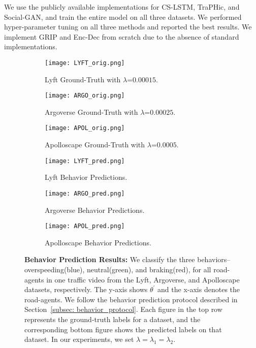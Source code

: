 \documentclass[10pt,twocolumn,letterpaper]{article}
\theoremstyle{plain}
\begin{document}
We use the publicly available implementations for CS-LSTM, TraPHic, and Social-GAN, and train the entire model on all three datasets. We performed hyper-parameter tuning on all three methods and reported the best results. We implement GRIP and Enc-Dec from scratch due to the absence of standard implementations.
\begin{figure*}
  \begin{subfigure}[h]{0.34\textwidth}
    \texttt{[image: LYFT\_orig.png]}
    \caption{Lyft Ground-Truth with $\lambda$=$0.00015$.}
    \label{fig:1}
  \end{subfigure}
\begin{subfigure}[h]{0.34\textwidth}
    \texttt{[image: ARGO\_orig.png]}
    \caption{Argoverse Ground-Truth with $\lambda$=$0.00025$.}
    \label{fig:1}
  \end{subfigure}
\begin{subfigure}[h]{0.34\textwidth}
    \texttt{[image: APOL\_orig.png]}
    \caption{Apolloscape Ground-Truth with $\lambda$=$0.0005$.}
    \label{fig:2}
  \end{subfigure}

  \begin{subfigure}[h]{0.34\textwidth}
    \texttt{[image: LYFT\_pred.png]}
    \caption{Lyft Behavior Predictions.}
    \label{fig:1}
  \end{subfigure}
\begin{subfigure}[h]{0.34\textwidth}
    \texttt{[image: ARGO\_pred.png]}
    \caption{Argoverse Behavior Predictions.}
    \label{fig:1}
  \end{subfigure}
\begin{subfigure}[h]{0.34\textwidth}
    \texttt{[image: APOL\_pred.png]}
    \caption{Apolloscape Behavior Predictions.}
    \label{fig:2}
  \end{subfigure}
  \caption{\textbf{Behavior Prediction Results:} We classify the three behaviors-- overspeeding(blue), neutral(green), and braking(red), for all road-agents in one traffic video from the Lyft, Argoverse, and Apolloscape datasets, respectively. The y-axis shows $\theta^{'}$ and the x-axis denotes the road-agents. We follow the behavior prediction protocol described in Section~\ref{subsec: behavior_protocol}. Each figure in the top row represents the ground-truth labels for a dataset, and the corresponding bottom figure shows the predicted labels on that dataset. In our experiments, we set $\lambda = \lambda_1 = \lambda_2$.}
  \label{fig: behavior}
  \vspace{-15pt}
\end{figure*}
 
\end{document}
